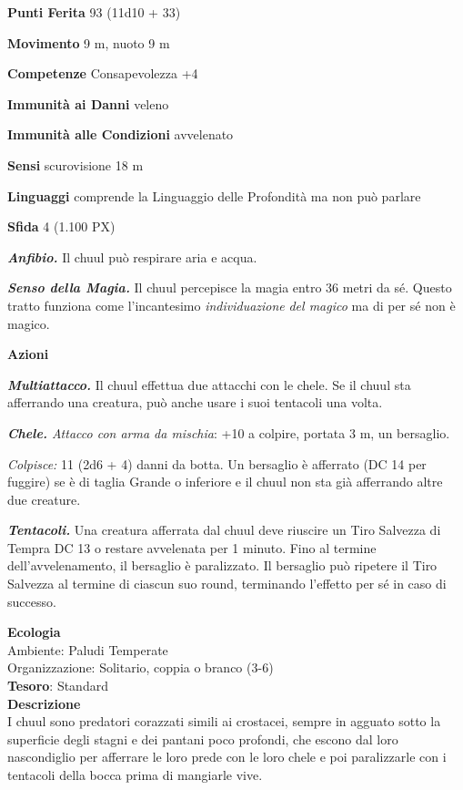 \begin{multicols}{2}
\textbf{Punti Ferita} 93 (11d10 + 33)

\textbf{Movimento} 9 m, nuoto 9 m

\textbf{Competenze} Consapevolezza +4

\textbf{Immunità ai Danni} veleno

\textbf{Immunità alle Condizioni} avvelenato

\textbf{Sensi} scurovisione 18 m

\textbf{Linguaggi} comprende la Linguaggio delle Profondità ma non può parlare

\textbf{Sfida} 4 (1.100 PX)

\textit{\textbf{Anfibio.}} Il chuul può respirare aria e acqua.

\textit{\textbf{Senso della Magia.}} Il chuul percepisce la magia entro 36 metri da sé. Questo tratto funziona come l'incantesimo \textit{individuazione} \textit{del magico} ma di per sé non è magico.

\textbf{Azioni}

\textit{\textbf{Multiattacco.}} Il chuul effettua due attacchi con le chele. Se il chuul sta afferrando una creatura, può anche usare i suoi tentacoli una volta.

\textit{\textbf{Chele.} Attacco con arma da mischia}: +10 a colpire, portata 3 m, un bersaglio.

\textit{Colpisce:} 11 (2d6 + 4) danni da botta. Un bersaglio è afferrato (DC 14 per fuggire) se è di taglia Grande o inferiore e il chuul non sta già afferrando altre due creature.

\textit{\textbf{Tentacoli.}} Una creatura afferrata dal chuul deve riuscire un Tiro Salvezza di Tempra DC 13 o restare avvelenata per 1 minuto. Fino al termine dell'avvelenamento, il bersaglio è paralizzato. Il bersaglio può ripetere il Tiro Salvezza al termine di ciascun suo round, terminando l'effetto per sé in caso di successo.

\textbf{Ecologia}\\
Ambiente: Paludi Temperate\\
Organizzazione: Solitario, coppia o branco (3-6)\\
\textbf{Tesoro}: Standard\\
\textbf{Descrizione}\\
I chuul sono predatori corazzati simili ai crostacei, sempre in agguato sotto la superficie degli stagni e dei pantani poco profondi, che escono dal loro nascondiglio per afferrare le loro prede con le loro chele e poi paralizzarle con i tentacoli della bocca prima di mangiarle vive.


\end{multicols}
